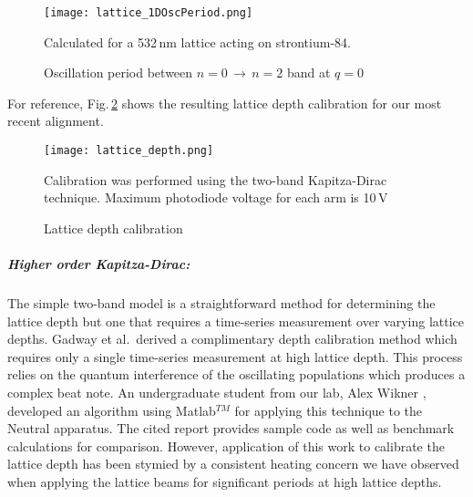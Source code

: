 	\begin{figure}
		\centerline{
		\texttt{[image: lattice\_1DOscPeriod.png]}}
		\caption{Oscillation period between $n=0\,\rightarrow\,n=2$ band at $q=0$}{Calculated for a 532\,nm lattice acting on strontium-84.}
		\label{fig:latOscPeriod}
	\end{figure} 
For reference, Fig.\,\ref{fig:latDepth} shows the resulting lattice depth calibration for our most recent alignment.
	\begin{figure} 
		\centerline{
		\texttt{[image: lattice\_depth.png]}}
		\caption{Lattice depth calibration}{Calibration was performed using the two-band Kapitza-Dirac technique. Maximum photodiode voltage for each arm is 10\,V}
		\label{fig:latDepth}
	\end{figure}
	
\subparagraph{Higher order Kapitza-Dirac:}
The simple two-band model is a straightforward method for determining the lattice depth but one that requires a time-series measurement over varying lattice depths.
Gadway et al.\,\cite{Gadway2009} derived a complimentary depth calibration method which requires only a single time-series measurement at high lattice depth.
This process relies on the quantum interference of the oscillating populations which produces a complex beat note.
An undergraduate student from our lab, Alex Wikner \cite{Wikner2017}, developed an algorithm using Matlab$^{TM}$ for applying this technique to the Neutral apparatus.
The cited report provides sample code as well as benchmark calculations for comparison.
However, application of this work to calibrate the lattice depth has been stymied by a consistent heating concern we have observed when applying the lattice beams for significant periods at high lattice depths.

